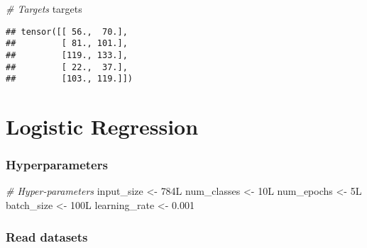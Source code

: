 \documentclass[]{book}
\newenvironment{Shaded}{\begin{snugshade}}{\end{snugshade}}
\newcommand{\CommentTok}[1]{\textcolor[rgb]{0.56,0.35,0.01}{\textit{#1}}}
\newcommand{\FloatTok}[1]{\textcolor[rgb]{0.00,0.00,0.81}{#1}}
\newcommand{\KeywordTok}[1]{\textcolor[rgb]{0.13,0.29,0.53}{\textbf{#1}}}
\newcommand{\NormalTok}[1]{#1}
\newcommand{\OperatorTok}[1]{\textcolor[rgb]{0.81,0.36,0.00}{\textbf{#1}}}
\newcommand{\StringTok}[1]{\textcolor[rgb]{0.31,0.60,0.02}{#1}}
\begin{document}
\begin{Shaded}
\begin{Highlighting}[]
\CommentTok{# Targets}
\NormalTok{targets}
\end{Highlighting}
\end{Shaded}

\begin{verbatim}
## tensor([[ 56.,  70.],
##         [ 81., 101.],
##         [119., 133.],
##         [ 22.,  37.],
##         [103., 119.]])
\end{verbatim}

\hypertarget{logistic-regression}{%
\chapter{Logistic Regression}\label{logistic-regression}}

\begin{Shaded}
\end{Shaded}

\hypertarget{hyperparameters}{%
\subsection{Hyperparameters}\label{hyperparameters}}

\begin{Shaded}
\begin{Highlighting}[]
\CommentTok{# Hyper-parameters }
\NormalTok{input_size    <-}\StringTok{ }\NormalTok{784L}
\NormalTok{num_classes   <-}\StringTok{ }\NormalTok{10L}
\NormalTok{num_epochs    <-}\StringTok{ }\NormalTok{5L}
\NormalTok{batch_size    <-}\StringTok{ }\NormalTok{100L}
\NormalTok{learning_rate <-}\StringTok{ }\FloatTok{0.001}
\end{Highlighting}
\end{Shaded}

\hypertarget{read-datasets}{%
\subsection{Read datasets}\label{read-datasets}}
\end{document}
